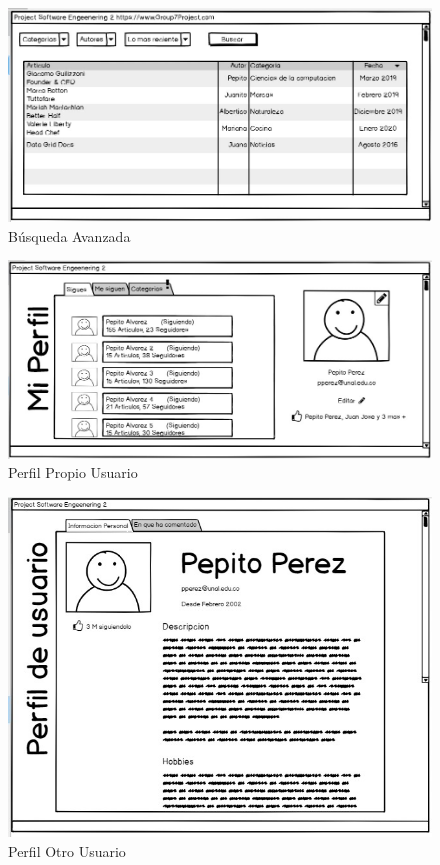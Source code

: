 \documentclass[a4paper,12 pt]{article}
\begin{document}
\begin{figure}[H]
    \centering
    \includegraphics[scale = 1]{images/BusquedaAvanzada.jpg}
    \caption{Búsqueda Avanzada}
    \label{F104}
\end{figure}{}

\begin{figure}[H]
    \centering
    \includegraphics[scale = 0.9]{images/PerfilPropioUsuario.jpg}
    \caption{Perfil Propio Usuario}
    \label{F105}
\end{figure}{}

\begin{figure}[H]
    \centering
    \includegraphics[scale = 1.3]{images/PerfilOtroUsuario.jpg}
    \caption{Perfil Otro Usuario}
    \label{F106}
\end{figure}{}
\end{document}
